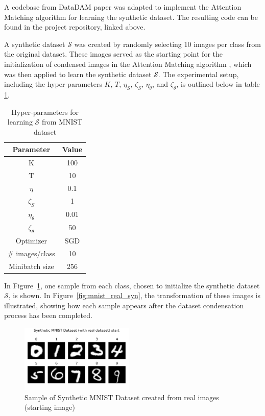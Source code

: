 \documentclass[conference, compsoc]{IEEEtran}
\begin{document}
	A codebase from DataDAM \cite{sajedi2023datadamefficientdatasetdistillation} paper was adapted to implement the Attention Matching algorithm for learning the synthetic dataset. The resulting code can be found in the project repository, linked above.
	
	
	A synthetic dataset $\mathcal{S}$ was created by randomly selecting 10 images per class from the original dataset. These images served as the starting point for the initialization of condensed images in the Attention Matching algorithm \cite{sajedi2023datadamefficientdatasetdistillation}, which was then applied to learn the synthetic dataset $\mathcal{S}$. The experimental setup, including the hyper-parameters $K$, $T$, $\eta_S$, $\zeta_S$, $\eta_{\theta}$, and $\zeta_{\theta}$, is outlined below in table \ref{table:parameters_mnist}.
	
	\begin{table}[H]
		\centering	
		\caption{Hyper-parameters for learning $\mathcal{S}$ from MNIST dataset}
		\begin{tabular}{|c|c|}
			\hline
			\textbf{Parameter} & \textbf{Value} \\ \hline
			K & 100 \\ \hline
			T & 10 \\ \hline
			$\eta$ & 0.1 \\ \hline
			$\zeta_S$ & 1 \\ \hline
			$\eta_{\theta}$ & 0.01 \\ \hline
			$\zeta_{\theta}$ & 50 \\ \hline
			Optimizer & SGD \\ \hline
			\# images/class & 10 \\ \hline
			Minibatch size & 256 \\ \hline
		\end{tabular}
		\label{table:parameters_mnist}
	\end{table}
	
	
	In Figure~\ref{fig:mnist_real_sample}, one sample from each class, chosen to initialize the synthetic dataset $\mathcal{S}$, is shown. In Figure~\ref{fig:mnist_real_syn}, the transformation of these images is illustrated, showing how each sample appears after the dataset condensation process has been completed.
	\begin{figure}[H]
		\centering
		\includegraphics[width=0.48\textwidth]{mnist_real_sample.png}
		\caption{Sample of Synthetic MNIST Dataset created from real images (starting image)}
		\label{fig:mnist_real_sample}
	\end{figure}
	
\end{document}

